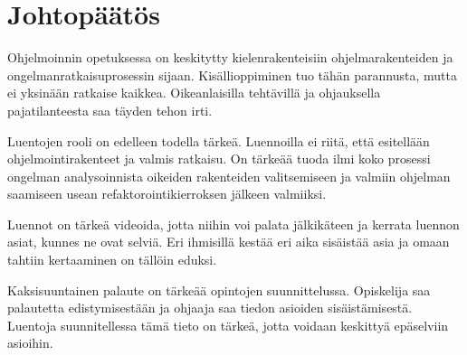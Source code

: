 \section{Johtopäätös}

Ohjelmoinnin opetuksessa on keskitytty kielenrakenteisiin ohjelmarakenteiden ja
ongelmanratkaisuprosessin sijaan. Kisällioppiminen tuo tähän parannusta, mutta
ei yksinään ratkaise kaikkea. Oikeanlaisilla tehtävillä ja ohjauksella
pajatilanteesta saa täyden tehon irti.

Luentojen rooli on edelleen todella tärkeä. Luennoilla ei riitä, että esitellään
ohjelmointirakenteet ja valmis ratkaisu. On tärkeää tuoda ilmi koko prosessi
ongelman analysoinnista oikeiden rakenteiden valitsemiseen ja valmiin ohjelman
saamiseen usean refaktorointikierroksen jälkeen valmiiksi.

Luennot on tärkeä videoida, jotta niihin voi palata jälkikäteen ja kerrata
luennon asiat, kunnes ne ovat selviä. Eri ihmisillä kestää eri aika sisäistää
asia ja omaan tahtiin kertaaminen on tällöin eduksi.

Kaksisuuntainen palaute on tärkeää opintojen suunnittelussa. Opiskelija saa
palautetta edistymisestään ja ohjaaja saa tiedon asioiden sisäistämisestä.
Luentoja suunnitellessa tämä tieto on tärkeä, jotta voidaan keskittyä epäselviin
asioihin.
